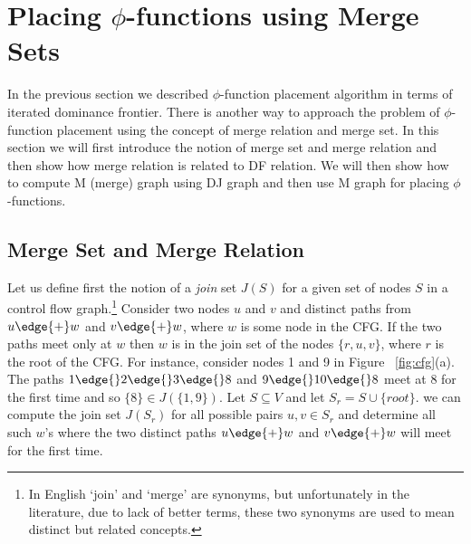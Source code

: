 \section{Placing $\phi$-functions using Merge Sets}

In the previous section we described $\phi$-function placement algorithm in terms 
of iterated dominance frontier. There is another way to approach the problem
of $\phi$-function placement using the concept of merge relation and merge set. In this section
we will first introduce the notion of merge set and merge relation and then show
how merge relation is related to DF relation. We will then show how to compute
M (merge) graph using DJ graph and then use M graph for placing $\phi$-functions.

\subsection{Merge Set and Merge Relation}

Let us
define first the notion of a {\em join} set $J(S)$
 for a given set of nodes  $S$ in a control flow
graph.\footnote{In English `join' and `merge' are synonyms, 
but unfortunately
in the literature, due to lack of  better terms, these two synonyms are used to mean
distinct but related concepts.} Consider two nodes $u$ and $v$ and distinct 
paths from $u \edge{+} w$ and $v \edge{+} w$, where $w$ is some node in the CFG. If the 
two paths meet only at $w$ then $w$ is in the join set of the nodes $\{r, u, v\}$,
where  $r$ is the root of the CFG. 
For instance, consider nodes 1 and 9 in Figure ~\ref{fig:cfg}(a).
The paths $1 \edge{} 2 \edge{} 3 \edge{} 8$ and $9 \edge{} 10 \edge{} 8$ meet at $8$ 
for the first time and so $\{8\} \in J(\{1,9\})$. Let $S \subseteq V$ and let
$S_r = S \cup \{root \}$. 
we can compute the join set $J(S_r)$ for all possible pairs $u, v \in S_r$ and determine
all such $w$'s where the two distinct paths $u \edge{+} w$ and $v \edge{+} w$ will
meet for the first time. 

